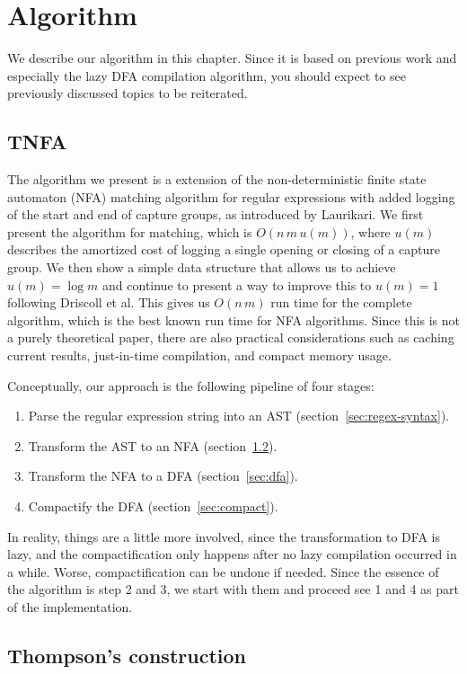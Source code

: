 \documentclass[11pt,a4paper,twoside,openright]{Thesis}
\theoremstyle{definition}
\newcommand{\Secref}[1]{section~\ref{sec:#1}}
\newcommand{\seclabel}[1]{\label{sec:#1}}
\begin{document}
\chapter{Algorithm} \seclabel{algo}
We describe our algorithm in this chapter. Since it is based on previous 
work and especially the lazy DFA compilation algorithm, you should expect to 
see previously discussed topics to be reiterated.

\section{TNFA}\label{sec:tnfa}

The algorithm we present is a extension of the non-deterministic finite state
automaton (NFA) matching algorithm for regular expressions with added logging
of the start and end of capture groups, as introduced by
Laurikari\cite{Laur00a}. We first present the algorithm for matching,
which is $O(n\, m\, u(m))$, where $u(m)$ describes the amortized cost of
logging a single opening or closing of a capture group. We then show a
simple data structure that allows us to achieve $u(m) = \log m$ and
continue to present a way to improve this to $u(m) = 1$ following Driscoll et
al\cite{Dris89a}. This gives us $O(n\, m)$ run time for the
complete algorithm, which is the best known run time for NFA algorithms. Since
this is not a purely theoretical paper, there are also practical considerations
such as caching current results, just-in-time compilation, and compact memory
usage.

Conceptually, our approach is the following pipeline of four stages:
\begin{enumerate}
  \item Parse the regular expression string into an AST (\Secref{regex-syntax}).
  \item Transform the AST to an NFA (\Secref{thompson}).
  \item Transform the NFA to a DFA (\Secref{dfa}).
  \item Compactify the DFA (\Secref{compact}).
\end{enumerate}

In reality, things are a little more involved, since the transformation
to DFA is lazy, and the compactification only happens after no lazy
compilation occurred in a while. Worse, compactification can be
undone if needed. Since the essence of the algorithm is step 2 and 3, 
we start with them and proceed see 1 and 4 as part of the implementation.

\section{Thompson's construction} 	\seclabel{thompson}
\end{document}
